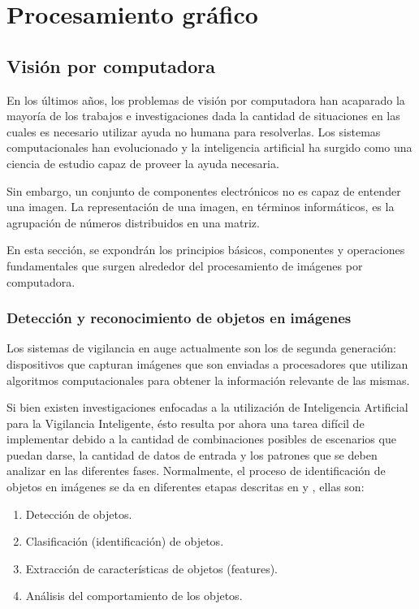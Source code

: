 \documentclass[a4paper,12pt,oneside,spanish]{book}
\begin{document}
\newpage
\chapter{Procesamiento gráfico}
\section{Visión por computadora}

En los últimos años, los problemas de visión por computadora han acaparado la mayoría de los trabajos e investigaciones dada la cantidad de situaciones en las cuales es necesario utilizar ayuda no humana para resolverlas. Los sistemas computacionales han evolucionado y la inteligencia artificial ha surgido como una ciencia de estudio capaz de proveer la ayuda necesaria. \par

Sin embargo, un conjunto de componentes electrónicos no es capaz de entender una imagen. La representación de una imagen, en términos informáticos, es la agrupación de números distribuidos en una matriz.\par

En esta sección, se expondrán los principios básicos, componentes y operaciones fundamentales que surgen alrededor del procesamiento de imágenes por computadora.\par


\subsection{Detección y reconocimiento de objetos en imágenes}

Los sistemas de vigilancia en auge actualmente son los de segunda generación: dispositivos que capturan imágenes que son enviadas a procesadores que utilizan algoritmos computacionales para obtener la información relevante de las mismas. \par

Si bien existen investigaciones enfocadas a la utilización de Inteligencia Artificial para la Vigilancia Inteligente, ésto resulta por ahora una tarea difícil de implementar debido a la cantidad de combinaciones posibles de escenarios que puedan darse, la cantidad de datos de entrada y los patrones que se deben analizar en las diferentes fases. Normalmente, el proceso de identificación de objetos en imágenes se da en diferentes etapas descritas en \cite{lozano} y \cite{kamarudin}, ellas son:	
\begin{enumerate}[noitemsep]
	\baselineskip 0pt
	\item Detección de objetos.\\	
	\item Clasificación (identificación) de objetos.\\
	\item Extracción de características de objetos (features).\\
	\item Análisis del comportamiento de los objetos.\\
\end{enumerate}	\baselineskip 14pt
\end{document}
